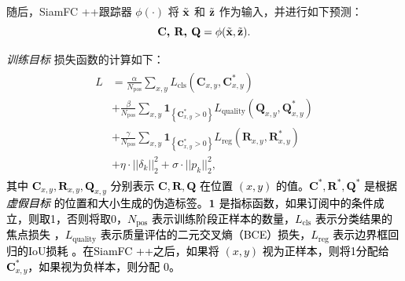 随后，SiamFC ++跟踪器 $\phi(\cdot)$ 将 $\tilde {\textbf x}$ 和 $\tilde{\textbf  z}$ 作为输入，并进行如下预测：
\begin{equation}
\textbf{C, R, Q} = \phi(\tilde {\textbf x}, \tilde{\textbf z}).
\end{equation}

\textit{训练目标} 损失函数的计算如下：
\begin{equation}
\begin{array}{l}
\begin{aligned}
L&=\frac{\alpha}{N_{\mathrm{pos}}} \sum_{x, y} L_{\mathrm{cls}}\left(\textbf{C}_{x, y}, \textbf{C}_{x, y}^{*}\right) \\
&+\frac{\beta}{N_{\mathrm{pos}}} \sum_{x, y} \textbf{1}_{\left\{\textbf{C}_{x, y}^{*}>0\right\}} L_{\mathrm{quality}}\left(\textbf{Q}_{x, y}, \textbf{Q}_{x, y}^{*}\right) \\
&+\frac{\gamma}{N_{\mathrm{pos}}} \sum_{x, y} \textbf{1}_{\left\{\textbf{C}_{x, y}^{*}>0\right\}} L_{\mathrm{reg}}\left(\textbf{R}_{x, y}, \textbf{R}_{x, y}^{*}\right) \\
&+\eta \cdot ||\delta_k||_2^2 +  \sigma \cdot ||p_k||^2_2,
\end{aligned}
\end{array}
\label{eq:loss}
\end{equation}
\textcolor{black} %
{其中 $\textbf{C}_{x, y}, \textbf{R}_{x, y}, \textbf{Q}_{x, y}$ 分别表示 $\textbf{C}, \textbf{R}, \textbf{Q}$ 在位置 $(x, y)$ 的值。$\textbf{C}^*, \textbf{R}^*, \textbf{Q}^*$ 是根据 \textit{虚假目标} 的位置和大小生成的伪造标签。$\textbf 1$ 是指标函数，如果订阅中的条件成立，则取1，否则将取0，$N_{\mathrm{pos}}$ 表示训练阶段正样本的数量，$L_{\mathrm{cls}}$ 表示分类结果的焦点损失 \cite{focal}，$L_{\mathrm{quality}}$ 表示质量评估的二元交叉熵（BCE）损失，$L_{\mathrm{reg}}$ 表示边界框回归的IoU损耗 \cite{iou-loss}。在SiamFC ++之后，如果将 $(x, y)$ 视为正样本，则将1分配给 $\textbf{C}_{x, y}^{*}$，如果视为负样本，则分配 0。}

